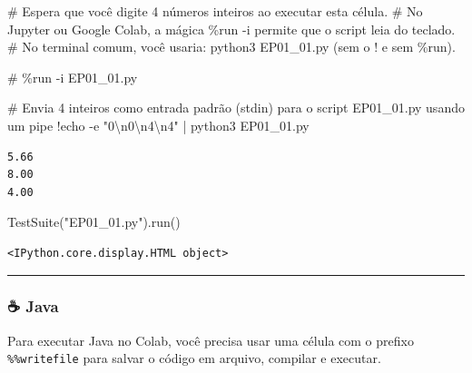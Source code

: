 \documentclass[
  portuguese,
  letterpaper,
  openany,
  oneside,
  12pt,
  a4paper]{book}
\newenvironment{Shaded}{\begin{snugshade}}{\end{snugshade}}
\newcommand{\CharTok}[1]{\textcolor[rgb]{0.13,0.47,0.30}{#1}}
\newcommand{\CommentTok}[1]{\textcolor[rgb]{0.37,0.37,0.37}{#1}}
\newcommand{\NormalTok}[1]{\textcolor[rgb]{0.00,0.23,0.31}{#1}}
\newcommand{\OperatorTok}[1]{\textcolor[rgb]{0.37,0.37,0.37}{#1}}
\newcommand{\StringTok}[1]{\textcolor[rgb]{0.13,0.47,0.30}{#1}}
\begin{document}
\begin{Shaded}
\begin{Highlighting}[]
\CommentTok{\# Espera que você digite 4 números inteiros ao executar esta célula.}
\CommentTok{\# No Jupyter ou Google Colab, a mágica \%run {-}i permite que o script leia do teclado.}
\CommentTok{\# No terminal comum, você usaria: python3 EP01\_01.py (sem o \textquotesingle{}!\textquotesingle{} e sem \textquotesingle{}\%run\textquotesingle{}).}

\CommentTok{\# \%run {-}i EP01\_01.py}
\end{Highlighting}
\end{Shaded}

\begin{Shaded}
\begin{Highlighting}[]
\CommentTok{\# Envia 4 inteiros como entrada padrão (stdin) para o script EP01\_01.py usando um pipe}
\OperatorTok{!}\NormalTok{echo }\OperatorTok{{-}}\NormalTok{e }\StringTok{"0}\CharTok{\textbackslash{}n}\StringTok{0}\CharTok{\textbackslash{}n}\StringTok{4}\CharTok{\textbackslash{}n}\StringTok{4"} \OperatorTok{|}\NormalTok{ python3 EP01\_01.py}
\end{Highlighting}
\end{Shaded}

\begin{verbatim}
5.66
8.00
4.00
\end{verbatim}

\begin{Shaded}
\begin{Highlighting}[]
\NormalTok{TestSuite(}\StringTok{"EP01\_01.py"}\NormalTok{).run()}
\end{Highlighting}
\end{Shaded}

\begin{verbatim}
<IPython.core.display.HTML object>
\end{verbatim}

\begin{center}\rule{0.5\linewidth}{0.5pt}\end{center}

\subsubsection{☕ Java}\label{java}

Para executar Java no Colab, você precisa usar uma célula com o prefixo
\texttt{\%\%writefile} para salvar o código em arquivo, compilar e
executar.
\end{document}
